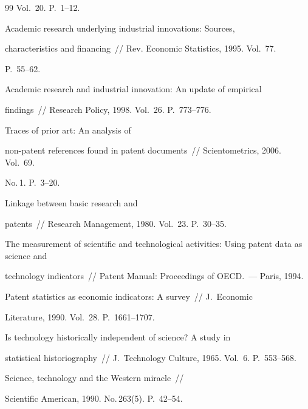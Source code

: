 {{\begin{thebibliography}{99}
Vol.~20. P.~1--12.




 Academic research underlying industrial innovations: Sources, 


characteristics and financing~/\!\!/ Rev. Economic Statistics, 1995. Vol.~77. 


P.~55--62.







 Academic research and industrial innovation: An update of empirical 


findings~/\!\!/ Research Policy, 1998. Vol.~26. P.~773--776.




 Traces of prior art: An analysis of 


non-patent references found in patent documents~/\!\!/ Scientometrics, 2006. Vol.~69. 


No.\,1. P.~3--20. 




 Linkage between basic research and 


patents~/\!\!/ Research Management, 1980. Vol.~23. P.~30--35.




The measurement of scientific and technological activities: Using patent data as science and 


technology indicators~/\!\!/ Patent Manual: Proceedings of OECD.~--- Paris, 1994.




 Patent statistics as economic indicators: A survey~/\!\!/ J.~Economic 


Literature, 1990. Vol.~28. P.~1661--1707.




 Is technology historically independent of science? A study in 


statistical historiography~/\!\!/ J.~Technology Culture, 1965. Vol.~6. P.~553--568.




 Science, technology and the Western miracle~/\!\!/ 


Scientific American, 1990. No.\,263(5). P.~42--54.



\end{thebibliography}}}
